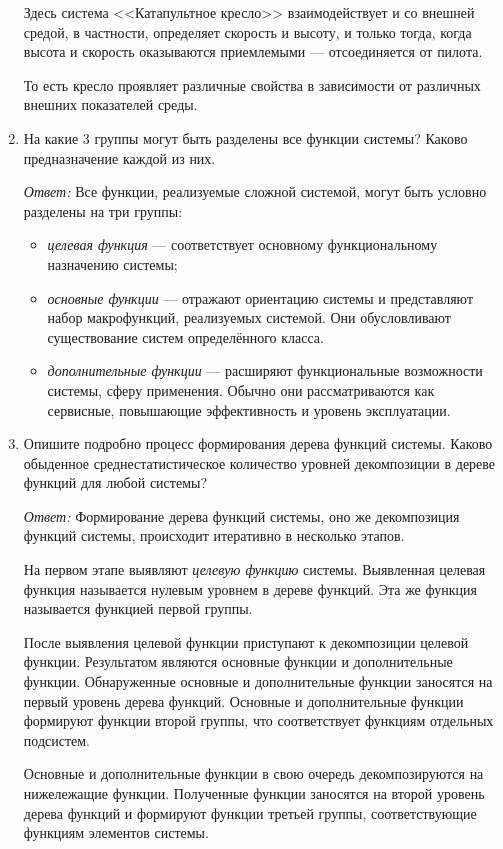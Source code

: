 \documentclass[10pt]{article}
\begin{document}
\begin{enumerate}
  Здесь система <<Катапультное кресло>> взаимодействует и со внешней средой, в частности, определяет скорость и высоту, и только тогда, когда высота и скорость оказываются приемлемыми --- отсоединяется от пилота.

  То есть кресло проявляет различные свойства в зависимости от различных внешних показателей среды.

\item{На какие 3 группы могут быть разделены все функции системы? Каково предназначение каждой из них.}

  \emph{Ответ:} Все функции, реализуемые сложной системой, могут быть условно разделены на три группы:

  \begin{itemize}
  \item{\emph{целевая функция} --- соответствует основному функциональному назначению системы;}
  \item{\emph{основные функции} --- отражают ориентацию системы и представляют набор макрофункций, реализуемых системой. Они обусловливают существование систем определённого класса.}
  \item{\emph{дополнительные функции} --- расширяют функциональные возможности системы, сферу применения. Обычно они рассматриваются как сервисные, повышающие эффективность и уровень эксплуатации.}
  \end{itemize}

\item{Опишите подробно процесс формирования дерева функций системы. Каково обыденное среднестатистическое количество уровней декомпозиции в дереве функций для любой системы?}

  \emph{Ответ:} Формирование дерева функций системы, оно же декомпозиция функций системы, происходит итеративно в несколько этапов.

  На первом этапе выявляют \emph{целевую функцию} системы. Выявленная целевая функция называется нулевым уровнем в дереве функций. Эта же функция называется функцией первой группы.

  После выявления целевой функции приступают к декомпозиции целевой функции. Результатом являются основные функции и дополнительные функции. Обнаруженные основные и дополнительные функции заносятся на первый уровень дерева функций. Основные и дополнительные функции формируют функции второй группы, что соответствует функциям отдельных подсистем.

  Основные и дополнительные функции в свою очередь декомпозируются на нижележащие функции. Полученные функции заносятся на второй уровень дерева функций и формируют функции третьей группы, соответствующие функциям элементов системы.


\end{enumerate}
\end{document}
